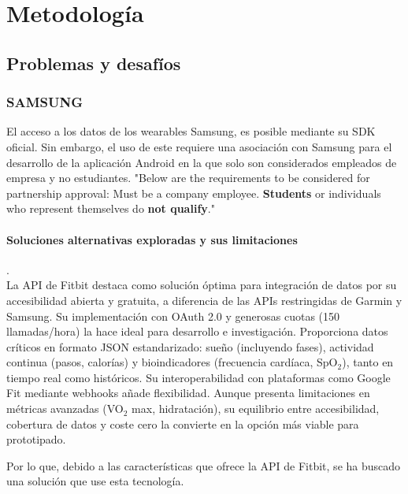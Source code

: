 \section{Metodología}

\subsection{Problemas y desafíos}

\subsubsection{SAMSUNG}
El acceso a los datos de los wearables Samsung, es posible mediante su SDK oficial. Sin embargo, el uso de este requiere una asociación con Samsung para el desarrollo de la aplicación Android en la que solo son considerados empleados de empresa y no estudiantes. "Below are the requirements to be considered for partnership approval:
Must be a company employee. \textbf{Students} or individuals who represent themselves do \textbf{not qualify}."  
 \cite{PartnershipRequest}

\paragraph{Soluciones alternativas exploradas y sus limitaciones} . \\
\label{sec:API Fitbit}
La API de Fitbit destaca como solución óptima para integración de datos por su accesibilidad abierta y gratuita, a diferencia de las APIs restringidas de Garmin y Samsung. Su implementación con OAuth 2.0 y generosas cuotas (150 llamadas/hora) la hace ideal para desarrollo e investigación. Proporciona datos críticos en formato JSON estandarizado: sueño (incluyendo fases), actividad continua (pasos, calorías) y bioindicadores (frecuencia cardíaca, SpO$_2$), tanto en tiempo real como históricos. Su interoperabilidad con plataformas como Google Fit mediante webhooks añade flexibilidad. Aunque presenta limitaciones en métricas avanzadas (VO$_2$ max, hidratación), su equilibrio entre accesibilidad, cobertura de datos y coste cero la convierte en la opción más viable para prototipado.

Por lo que, debido a las características que ofrece la API de Fitbit, se ha buscado una solución que use esta tecnología.


\label{sec:SolucionSamsung}
